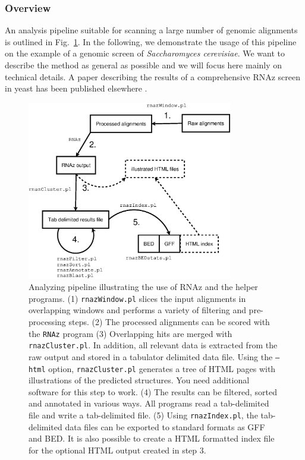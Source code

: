 \documentclass[11pt]{article}
\begin{document}
\subsubsection{Overview}

An analysis pipeline suitable for scanning a large number of genomic
alignments is outlined in Fig.~\ref{fig:pipeline}. In the following,
we demonstrate the usage of this pipeline on the example of a genomic
screen of \emph{Saccharomyces cerevisiae}. We want to describe the
method as general as possible and we will focus here mainly on
technical details. A paper describing the results of a comprehensive
RNAz screen in yeast has been published elsewhere \cite{Steigele:07}.

\begin{figure}
  \centerline{\includegraphics*[width=0.8\textwidth]{figs/flowchart.eps}}

  \caption{Analyzing pipeline illustrating the use of RNAz and the
    helper programs.  (1) \texttt{rnazWindow.pl} slices the input
    alignments in overlapping windows and performs a variety of
    filtering and pre-processing steps. (2) The processed alignments
    can be scored with the \texttt{RNAz} program (3) Overlapping hits
    are merged with \texttt{rnazCluster.pl}. In addition, all relevant
    data is extracted from the raw output and stored in a tabulator
    delimited data file. Using the \texttt{--html} option,
    \texttt{rnazCluster.pl} generates a tree of HTML pages with
    illustrations of the predicted structures. You need additional
    software for this step to work. (4) The results can be filtered,
    sorted and annotated in various ways. All programs read a
    tab-delimited file and write a tab-delimited file. (5) Using
    \texttt{rnazIndex.pl}, the tab-delimited data files can be
    exported to standard formats as GFF and BED. It is also possible
    to create a HTML formatted index file for the optional HTML output
    created in step 3.}
\label{fig:pipeline}
\end{figure}
\end{document}
